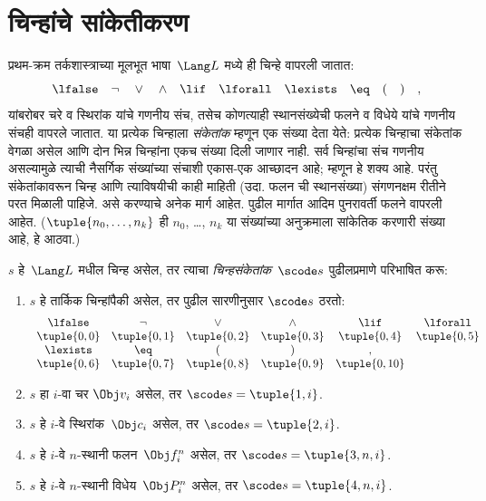 \section{चिन्हांचे सांकेतीकरण}\label{inc:art:cod:sec}

प्रथम-क्रम तर्कशास्त्राच्या मूलभूत भाषा~$\Lang L$ मध्ये ही चिन्हे वापरली जातात:
\[\lfalse \quad \lnot \quad \lor \quad \land \quad \lif \quad \lforall
\quad \lexists \quad \eq \quad ( \quad ) \quad ,
\]
यांबरोबर चरे व स्थिरांक यांचे गणनीय संच, तसेच कोणत्याही
स्थानसंख्येची फलने व विधेये यांचे गणनीय संचही
वापरले जातात. या प्रत्येक चिन्हाला \emph{संकेतांक} म्हणून एक संख्या
देता येते: प्रत्येक चिन्हाचा संकेतांक वेगळा असेल आणि दोन भिन्न
चिन्हांना एकच संख्या दिली जाणार नाही. सर्व चिन्हांचा संच गणनीय
असल्यामुळे त्याची नैसर्गिक संख्यांच्या संचाशी एकास-एक आच्छादन आहे;
म्हणून हे शक्य आहे. परंतु संकेतांकावरून चिन्ह आणि त्याविषयीची काही
माहिती (उदा. फलन ची स्थानसंख्या) संगणनक्षम रीतीने परत
मिळाली पाहिजे. असे करण्याचे अनेक मार्ग आहेत. पुढील मार्गात आदिम
पुनरावर्ती फलने वापरली आहेत. ($\tuple{n_0, \dots, n_k}$ ही
$n_0$, \dots, $n_k$ या संख्यांच्या अनुक्रमाला सांकेतिक करणारी संख्या
आहे, हे आठवा.)

\begin{defn}
$s$ हे~$\Lang L$ मधील चिन्ह असेल, तर त्याचा \emph{चिन्हसंकेतांक}~$\scode s$
पुढीलप्रमाणे परिभाषित करू:
\begin{enumerate}
\item $s$ हे तार्किक चिन्हांपैकी असेल, तर पुढील सारणीनुसार $\scode s$ ठरतो:
\[\begin{array}{cccccccccc}
  \lfalse & \lnot & \lor & \land & \lif & \lforall \\
\tuple{0, 0} & \tuple{0, 1} & \tuple{0, 2} & \tuple{0, 3} &
\tuple{0, 4} & \tuple{0, 5} \\
\lexists & \eq & ( & ) & ,\\
\tuple{0, 6} & \tuple{0, 7} &
\tuple{0, 8} & \tuple{0, 9} & \tuple{0, 10}
\end{array}
\]
\item $s$ हा $i$-वा चर $\Obj v_i$ असेल, तर $\scode s = \tuple{1, i}$.
\item $s$ हे $i$-वे स्थिरांक~$\Obj c_i$ असेल, तर
  $\scode s = \tuple{2, i}$.
\item $s$ हे $i$-वे $n$-स्थानी फलन~$\Obj f_i^n$ असेल, तर
  $\scode s = \tuple{3, n, i}$.
\item $s$ हे $i$-वे $n$-स्थानी विधेय~$\Obj P_i^n$ असेल, तर
  $\scode s = \tuple{4, n, i}$.
\end{enumerate}
\end{defn}


